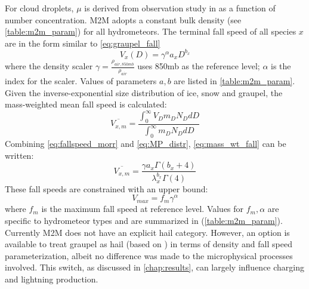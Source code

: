 For cloud droplets, $\mu$ is derived from observation study in \cite{martin1994measurement} as a function of number concentration. M2M adopts a constant bulk density (see \ref{table:m2m_param}) for all hydrometeors. The terminal fall speed of all species $x$ are in the  form similar to \ref{eq:graupel_fall}
\begin{equation}
    V_x(D) = 
    \gamma^{\alpha}
    a_x D^{b_x}
    \label{eq:fallspeed_morr}
\end{equation}
where the density scaler $\gamma=\frac{\rho_{air,850mb}}{\rho_{air}}$  uses 850mb as the reference level; $\alpha$ is the index for the scaler. Values of parameters $a,b$ are listed in \ref{table:m2m_param}. Given the inverse-exponential size distribution of ice, snow and graupel, the mass-weighted mean fall speed is calculated:
\begin{equation}
    \overline{V_{x,m}} = 
    \frac{\int_0^{\infty} V_D m_D N_D dD} {\int_0^{\infty} m_D N_D dD}
    \label{eq:mass_wt_fall}
\end{equation}
Combining \ref{eq:fallspeed_morr} and \ref{eq:MP_distr}, \ref{eq:mass_wt_fall} can be written:
\begin{equation}
    \overline{V_{x,m}} = 
    \frac{\gamma a_x \Gamma(b_x+4)} {\lambda_x^{b_x} \Gamma(4)}
    \label{eq:integrated_mean_fall}
\end{equation}
These fall speeds are constrained with an upper bound:
\begin{equation}
    V_{max} = 
    f_m \gamma ^{\alpha}
\end{equation}
where $f_m$ is the maximum fall speed at reference level. Values for $f_m, \alpha$ are specific to hydrometeor types and are summarized in (\ref{table:m2m_param}).
Currently M2M does not have an explicit hail category. However, an option is available to treat graupel as hail (based on \cite{matson1980direct}) in terms of density and fall speed parameterization, albeit no difference was made to the microphysical processes involved. This switch, as discussed in \ref{chap:results}, can largely influence charging and lightning production.

